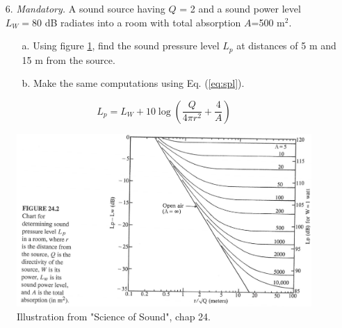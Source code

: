 \documentclass{article}
\begin{document}
\begin{itemize}
    
    \item[6.] \textit{Mandatory.} A sound source having $Q$ = 2 and a sound power level $L_W = 80$ dB radiates into a room with total absorption $A$=500 m$^2$.
    
    \begin{itemize}
        \item [a.] Using figure \ref{fig:curve}, find the sound pressure level $L_p$ at distances of 5 m  and 15 m from the source.
        \item [b.] Make the same computations using Eq. (\ref{eq:spl}).
    \end{itemize}
    
  

\end{itemize}


  \begin{equation}
        L_p = L_W + 10\log(\frac{Q}{4 \pi r^2} + \frac{4}{A})
        \label{eq:spl}
    \end{equation}

\begin{figure}[H]
    \centering
    \includegraphics[scale=0.7]{figures/oving2_1.png}
    \caption{Illustration from "Science of Sound", chap 24.}
    \label{fig:curve}
\end{figure}
\end{document}
